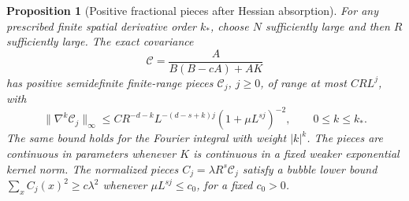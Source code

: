 \documentclass[11pt]{article}
\newtheorem{proposition}{Proposition}[section]
\begin{document}
\begin{proposition}[Positive fractional pieces after Hessian absorption]
\label{complete:covariance-prop}
For any prescribed finite spatial derivative order \(k_*\), choose
\(N\) sufficiently large and then \(R\) sufficiently large. The exact
covariance
\begin{equation}\label{complete:target-cov}
 \mathscr C=\frac{A}{B(B-cA)+AK}
\end{equation}
has positive semidefinite finite-range pieces \(\mathscr C_j\),
\(j\ge0\), of range at most \(CRL^j\), with
\begin{equation}\label{complete:cov-bounds}
 \|\nabla^k\mathscr C_j\|_\infty
 \le C R^{-d-k}L^{-(d-s+k)j}
              (1+\mu L^{sj})^{-2},\qquad 0\le k\le k_*.
\end{equation}
The same bound holds for the Fourier integral with weight \(|k|^k\).
The pieces are continuous in parameters whenever \(K\) is continuous
in a fixed weaker exponential kernel norm. The normalized pieces
\(C_j=\lambda R^s\mathscr C_j\) satisfy a bubble lower bound
\(\sum_x C_j(x)^2\ge c\lambda^2\) whenever
\(\mu L^{sj}\le c_0\), for a fixed \(c_0>0\).
\end{proposition}
\end{document}
